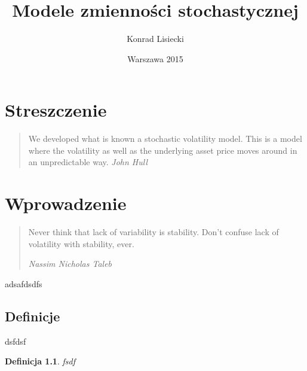 \documentclass{pracamgr}
\author{Konrad Lisiecki}
\title{Modele zmienności stochastycznej}
\date{Warszawa 2015}
\newtheorem{defi}{Definicja}[section]
\begin{document}
\maketitle
\nocite{book-full} 

\chapter*{Streszczenie} 

\begin{quote}
We developed what is known a stochastic volatility model. This is a model where the volatility as well as the underlying asset price moves around in an unpredictable way.
\raggedleft\slshape John Hull 
\end{quote}



\tableofcontents
 

 


\chapter{Wprowadzenie}\label{r:pojecia}
\begin{quote}

Never think that lack of variability is stability. Don't confuse lack of volatility with stability, ever.
 
\raggedleft\slshape Nassim Nicholas Taleb 
\end{quote}
 


adsafdsdfs
 
\section{Definicje}
dsfdsf

\begin{defi}\label{aa}
fsdf
\end{defi}
\end{document}

